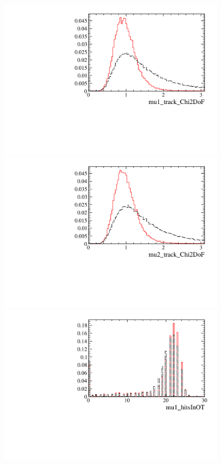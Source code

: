 \begin{figure} [htb!]
\begin{center}
\includegraphics[scale=0.20]{figs/mu1_track_Chi2DoFPARTIAL.pdf}
\includegraphics[scale=0.20]{figs/mu2_track_Chi2DoFPARTIAL.pdf}
\includegraphics[scale=0.20]{figs/mu1_hitsInOTPARTIAL.pdf}

\end{center}
\end{figure}

